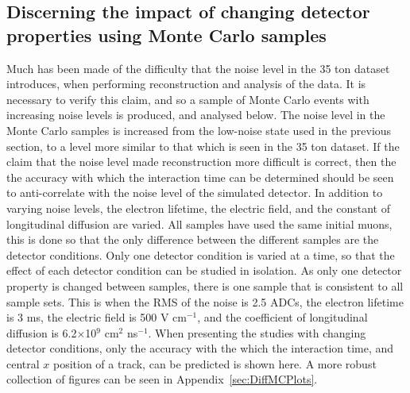 \subsection{Discerning the impact of changing detector properties using Monte Carlo samples} \label{sec:DiffMCStudies}
Much has been made of the difficulty that the noise level in the 35 ton dataset introduces, when performing reconstruction and analysis of the data. It is necessary to verify this claim, and so a sample of Monte Carlo events with increasing noise levels is produced, and analysed below. The noise level in the Monte Carlo samples is increased from the low-noise state used in the previous section, to a level more similar to that which is seen in the 35 ton dataset. If the claim that the noise level made reconstruction more difficult is correct, then the the accuracy with which the interaction time can be determined should be seen to anti-correlate with the noise level of the simulated detector. In addition to varying noise levels, the electron lifetime, the electric field, and the constant of longitudinal diffusion are varied. All samples have used the same initial muons, this is done so that the only difference between the different samples are the detector conditions. Only one detector condition is varied at a time, so that the effect of each detector condition can be studied in isolation. As only one detector property is changed between samples, there is one sample that is consistent to all sample sets. This is when the RMS of the noise is 2.5 ADCs, the electron lifetime is 3 ms, the electric field is 500 V cm$^{-1}$, and the coefficient of longitudinal diffusion is 6.2$\times$10$^9$ cm$^2$ ns$^{-1}$. When presenting the studies with changing detector conditions, only the accuracy with the which the interaction time, and central $x$ position of a track, can be predicted is shown here. A more robust collection of figures can be seen in Appendix~\ref{sec:DiffMCPlots}. \\

